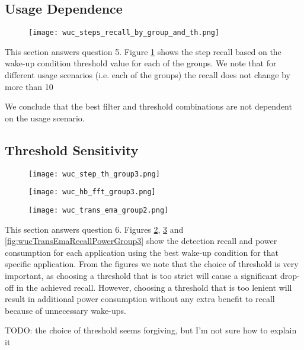 \subsection{Usage Dependence}

\begin{figure}[h]
	\texttt{[image: wuc\_steps\_recall\_by\_group\_and\_th.png]}
	\caption{}
    \label{fig:wucStepsRecallByGroupAndThreshold}
\end{figure}

This section answers question 5. Figure \ref{fig:wucStepsRecallByGroupAndThreshold} shows the step recall based on the wake-up condition threshold value for each of the groups. We note that for different usage scenarios (i.e. each of the groups) the recall does not change by more than 10%

We conclude that the best filter and threshold combinations are not dependent on the usage scenario.


\subsection{Threshold Sensitivity}

\begin{figure}[h]
	\texttt{[image: wuc\_step\_th\_group3.png]}
	\caption{}
    \label{fig:wucStepThRecallPowerGroup2}
\end{figure}

\begin{figure}[h]
	\texttt{[image: wuc\_hb\_fft\_group3.png]}
	\caption{}
    \label{fig:wucHbFftRecallPowerGroup3}
\end{figure}

\begin{figure}[h]
	\texttt{[image: wuc\_trans\_ema\_group2.png]}
	\caption{}
    \label{fig:wucTransEmaRecallPowerGroup2}
\end{figure}


This section answers question 6. Figures \ref{fig:wucStepThRecallPowerGroup2}, \ref{fig:wucHbFftRecallPowerGroup3} and \ref{fig:wucTransEmaRecallPowerGroup3} show the detection recall and power consumption for each application using the best wake-up condition for that specific application. From the figures we note that the choice of threshold is very important, as choosing a threshold that is too strict will cause a significant drop-off in the achieved recall. However, choosing a threshold that is too lenient will result in additional power consumption without any extra benefit to recall because of unnecessary wake-ups. 

TODO: the choice of threshold seems forgiving, but I'm not sure how to explain it